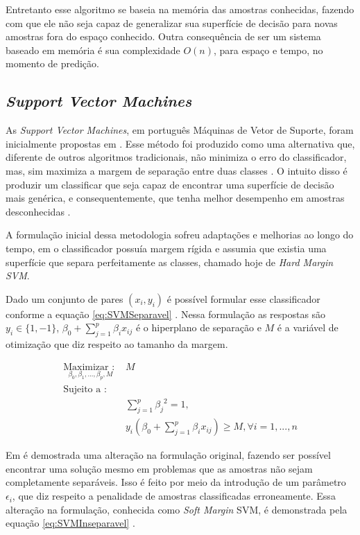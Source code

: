 Entretanto esse algoritmo se baseia na memória das amostras conhecidas, fazendo com que ele não seja capaz de generalizar sua superfície de decisão para novas amostras fora do espaço conhecido. Outra consequência de ser um sistema baseado em memória é sua complexidade $O(n)$, para espaço e tempo, no momento de predição. 


\subsection{\textit{Support Vector Machines}}
As \textit{Support Vector Machines}, em português Máquinas de Vetor de Suporte, foram inicialmente propostas em . Esse método foi produzido como uma alternativa que, diferente de outros algoritmos tradicionais, não minimiza o erro do classificador, mas, sim maximiza a margem de separação entre duas classes \cite{James20131}. O intuito disso é produzir um classificar que seja capaz de encontrar uma superfície de decisão mais genérica, e consequentemente, que tenha melhor desempenho em amostras desconhecidas \cite{Cortes1995}.

A formulação inicial dessa metodologia sofreu adaptações e melhorias ao longo do tempo, em  o classificador possuía margem rígida e assumia que existia uma superfície que separa perfeitamente as classes, chamado hoje de \textit{Hard Margin SVM}.

Dado um conjunto de pares $(x_i, y_i)$ é possível formular esse classificador conforme a equação \ref{eq:SVMSeparavel} \cite{James20131}. Nessa formulação as respostas são $y_i \in \{1, -1\}$, $\beta_0 + \sum_{j=1}^{p}{{\beta_i x_{ij}}}$ é o hiperplano de separação e $M$ é a variável de otimização que diz respeito ao tamanho da margem. 

\begin{equation}
\begin{split}
\underset {\beta_0, \beta_1, ..., \beta_p, M}  {\text{Maximizar : }} &{M} \\
\text{Sujeito a : } \\
&\sum_{j=1}^{p}{{\beta_j}^2} = 1, \\
&y_i(\beta_0 + \sum_{j=1}^{p}{{\beta_i x_{ij}}}) \geq M, \forall i = 1, ..., n
\end{split}
\label{eq:SVMSeparavel}
\end{equation}

Em  é demostrada uma alteração na formulação original, fazendo ser possível encontrar uma solução mesmo em problemas que as amostras não sejam completamente separáveis. Isso é feito por meio da introdução de um parâmetro $\epsilon_i$, que diz respeito a penalidade de amostras classificadas erroneamente. Essa alteração na formulação, conhecida como \textit{Soft Margin} SVM, é demonstrada pela equação \ref{eq:SVMInseparavel} \cite{James20131}.

